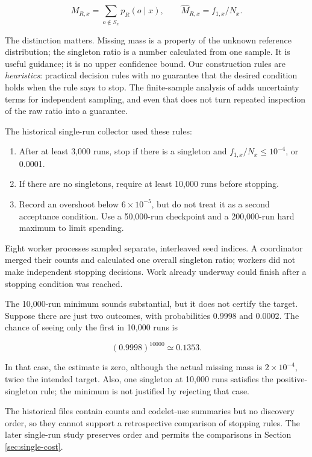 \documentclass[10pt,letterpaper]{article}
\newcommand{\tightlist}{\setlength{\itemsep}{0pt}\setlength{\parskip}{0pt}}
\begin{document}
\[
M_{R,x}=\sum_{o\notin S_x}p_R(o\mid x),\qquad
\widehat M_{R,x}=f_{1,x}/N_x.
\]

The distinction matters. Missing mass is a property of the unknown reference distribution;
the singleton ratio is a number calculated from one sample. It is useful guidance; it is
no upper confidence bound. Our construction rules are \emph{heuristics}: practical
decision rules with no guarantee that the desired condition holds when the rule says to
stop. The finite-sample analysis of \citet{ref10} adds uncertainty terms for independent
sampling, and even that does not turn repeated inspection of the raw ratio into a
guarantee.

The historical single-run collector used these rules:

\begin{enumerate}
\def\labelenumi{\arabic{enumi}.}
\tightlist
\item
  After at least 3,000 runs, stop if there is a singleton and \(f_{1,x}/N_x\le10^{-4}\),
  or 0.0001.
\item
  If there are no singletons, require at least 10,000 runs before stopping.
\item
  Record an overshoot below \(6\times10^{-5}\), but do not treat it as a second acceptance
  condition. Use a 50,000-run checkpoint and a 200,000-run hard maximum to limit spending.
\end{enumerate}

Eight worker processes sampled separate, interleaved seed indices. A coordinator merged
their counts and calculated one overall singleton ratio; workers did not make independent
stopping decisions. Work already underway could finish after a stopping condition was
reached.

The 10,000-run minimum sounds substantial, but it does not certify the target. Suppose
there are just two outcomes, with probabilities 0.9998 and 0.0002. The chance of seeing
only the first in 10,000 runs is

\[
(0.9998)^{10000}\simeq0.1353.
\]

In that case, the estimate is zero, although the actual missing mass is
\(2\times10^{-4}\), twice the intended target. Also, one singleton at 10,000 runs
satisfies the positive-singleton rule; the minimum is not justified by rejecting that
case.

The historical files contain counts and codelet-use summaries but no discovery order, so
they cannot support a retrospective comparison of stopping rules. The later single-run
study preserves order and permits the comparisons in Section \ref{sec:single-cost}.
\end{document}

